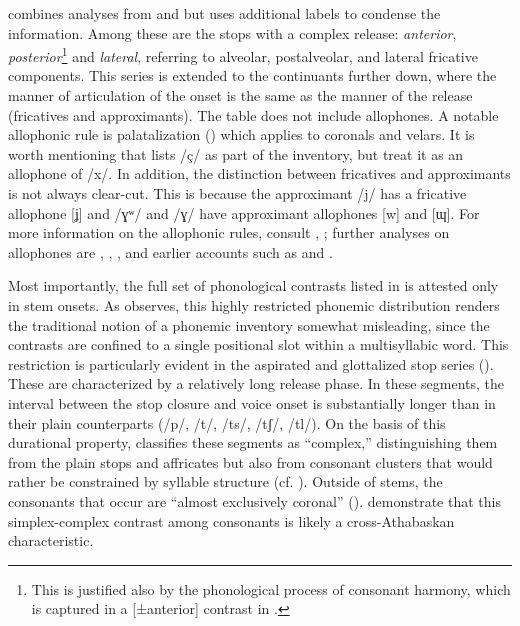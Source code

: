  combines analyses from \citet{Young:1987uj} and \citet{McDonough:2003tp} but uses additional labels to condense the information. Among these are the stops with a complex release: \textit{anterior}, \textit{posterior}\footnote{This is justified also by the phonological process of consonant harmony, which is captured in a [±anterior] contrast in \citet[50--51]{McDonough:2003tp}.} and \textit{lateral}, referring to alveolar, postalveolar, and lateral fricative components. This series is extended to the continuants further down, where the manner of articulation of the onset is the same as the manner of the release (fricatives and approximants). The table does not include allophones. A notable allophonic rule is palatalization (\cite[vx]{Young:1987uj}) which applies to coronals and velars. It is worth mentioning that \citet[4]{McDonough:2003tp} lists /ç/ as part of the inventory, but \citet[vx]{Young:1987uj} treat it as an allophone of /x/. In addition, the distinction between fricatives and approximants is not always clear-cut. This is because the approximant /j/ has a fricative allophone [ʝ] and /ɣʷ/ and /ɣ/ have approximant allophones [w] and [ɰ]. For more information on the allophonic rules, consult \citet[xii-xv]{Young:1987uj}, \citet{McDonough:2003tp}; further analyses on allophones are \citet{Iskarous:2012qz}, \citet{McDonough:1990gn}, \citet{Palakurthy:2019pw}, and earlier accounts such as \citet{Saville:1968tm} and \citet{Harris:1945to}. 

Most importantly, the full set of phonological contrasts listed in  is attested only in stem onsets. As \citet[7]{McDonough:2003tp} observes, this highly restricted phonemic distribution renders the traditional notion of a phonemic inventory somewhat misleading, since the contrasts are confined to a single positional slot within a multisyllabic word. This restriction is particularly evident in the aspirated and glottalized stop series (\cite[43--45]{McDonough:2003tp}). These are characterized by a relatively long release phase. In these segments, the interval between the stop closure and voice onset is substantially longer than in their plain counterparts (/p/, /t/, /ts/, /tʃ/, /tl/). On the basis of this durational property, \citet[81]{McDonough:2003tp} classifies these segments as ``complex,'' distinguishing them from the plain stops and affricates but also from consonant clusters that would rather be constrained by syllable structure (cf. \cite[75]{McDonough:2003tp}). Outside of stems, the consonants that occur are ``almost exclusively coronal'' (\cite[43]{McDonough:2003tp}). \citet{McDonough:2008gh} demonstrate that this simplex-complex contrast among consonants is likely a cross-Athabaskan characteristic.

